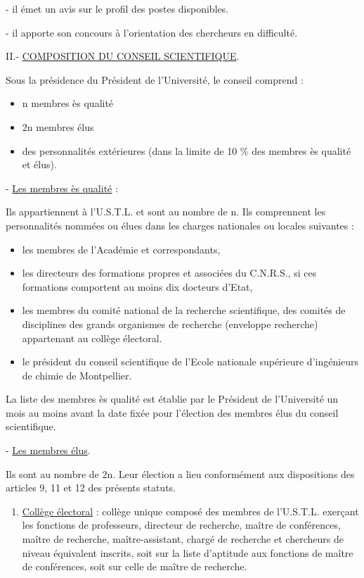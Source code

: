 
- il émet un avis sur le profil des postes disponibles.

- il apporte son concours à l'orientation des chercheurs en difficulté.

II.- \uline{COMPOSITION DU CONSEIL SCIENTIFIQUE}.

Sous la présidence du Président de l'Université, le conseil comprend :
\begin{itemize}[label={},leftmargin=3em]
\item n membres ès qualité
\item 2n membres élus
\item des personnalités extérieures (dans la limite de 10 \% des membres ès qualité et élus).
\end{itemize}

- \uline{Les membres ès qualité} :

Ils appartiennent à l'U.S.T.L. et sont au nombre de n. Ils comprennent les personnalités nommées ou élues dans les charges nationales ou locales suivantes :
\begin{itemize}[label=$\cdot$]
\item les membres de l'Académie et correspondants,
\item les directeurs des formations propres et associées du C.N.R.S., si ces formations comportent au moins dix docteurs d'Etat,
\item les membres du comité national de la recherche scientifique, des comités de disciplines des grands organismes de recherche (enveloppe recherche) appartenant au collège électoral.
\item le président du conseil scientifique de l'Ecole nationale supérieure d'ingénieurs de chimie de Montpellier.
\end{itemize}

La liste des membres ès qualité est établie par le Président de l'Université un mois au moins avant la date fixée pour l'élection des membres élus du conseil scientifique.

- \uline{Les membres élus}.

Ils sont au nombre de 2n. Leur élection a lieu conformément aux dispositions des articles 9, 11 et 12 des présents statuts.

\begin{enumerate}[label=a)-]
\item \uline{Collège électoral} : collège unique composé des membres de l'U.S.T.L. exerçant les fonctions de professeurs, directeur de recherche, maître de conférences, maître de recherche, maître-assistant, chargé de recherche et chercheurs de niveau équivalent inscrits, soit sur la liste d'aptitude aux fonctions de maître de conférences, soit sur celle de maître de recherche.
\end{enumerate}

